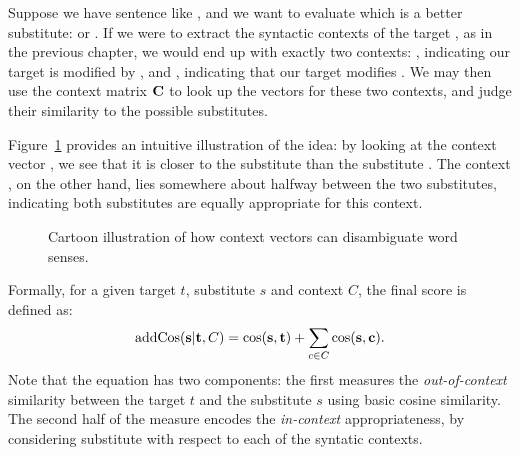 Suppose we have sentence like , and we
want to evaluate which is a better substitute:  or .
If we were to extract the syntactic contexts of the target , as in
the previous chapter, we would end up with exactly two contexts:
, indicating our target is modified by , and
, indicating that our target modifies
. We may then use the context matrix ${{\mathbf{C}}}$ to look up the
vectors for these two contexts, and judge their similarity to the possible
substitutes.

Figure~\ref{fig:substitution} provides an intuitive illustration of the idea:
by looking at the context vector , we see that it is
closer to the substitute  than the substitute . The
context , on the other hand, lies somewhere about halfway
between the two substitutes, indicating both substitutes are equally appropriate
for this context.

\begin{figure}
\centering
{}
\caption{Cartoon illustration of how context vectors can disambiguate word senses.}
\label{fig:substitution}
\end{figure}

Formally, for a given target $t$, substitute $s$ and context $C$, the final
{\addCos} score is defined as:
\begin{equation}
  \text{addCos}({\mathbf{s}}|{\mathbf{t}},C) = \text{cos}({\mathbf{s}}, {\mathbf{t}}) + \sum_{c\in C} \text{cos}({\mathbf{s}}, {\mathbf{c}}).
\end{equation}
Note that the equation has two components: the first measures the {\em
out-of-context} similarity between the target $t$ and the substitute $s$ using
basic cosine similarity. The second half of the measure encodes the {\em
in-context} appropriateness, by considering substitute with respect to
each of the syntatic contexts.

